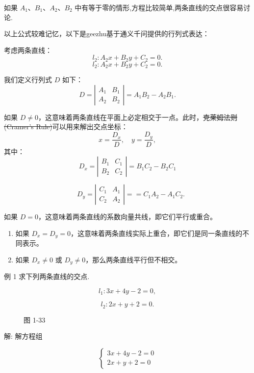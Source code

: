 \documentclass[lang=cn,newtx,12pt,scheme=chinese]{elegantbook}
\begin{document}
如果 \({A}_{1}\text{、}{B}_{1}\text{、}{A}_{2}\text{、}{B}_{2}\) 中有等于零的情形,方程比较简单,两条直线的交点很容易讨论.

以上公式较难记忆，以下是geezhu基于通义千问提供的行列式表达：

考虑两条直线：
\[
l_2: A_2x + B_2y + C_2 = 0.
\]
\[
l_2: A_2x + B_2y + C_2 = 0.
\]

我们定义行列式 \(D\) 如下：
\[
  D = \left| \begin{array}{cc}
               A_1 & B_1 \\
               A_2 & B_2
  \end{array} \right| = A_1B_2 - A_2B_1.
\]

如果 \(D \neq 0\)，这意味着两条直线在平面上必定相交于一点。此时，\sout{克莱姆法则(Cramer's Rule)}可以用来解出交点坐标：
\[
  x = \frac{D_x}{D}, \quad y = \frac{D_y}{D},
\]
其中：
\[
  D_x = \left| \begin{array}{cc}
                  B_1 & C_1 \\
                  B_2 & C_2
  \end{array} \right|=B_1C_2-B_2C_1\]

\[ \quad
D_y = \left| \begin{array}{cc}
               C_1 & A_1 \\
               C_2 & A_2
\end{array} \right| ==C_1A_2-A_1C_2.
\]

如果 \(D = 0\)，这意味着两条直线的系数向量共线，即它们平行或重合。

\begin{enumerate}
  \item 如果 \(D_x = D_y = 0\)，这意味着两条直线实际上重合，即它们是同一条直线的不同表示。
  \item 如果 \(D_x \neq 0\) 或 \(D_y \neq 0\)，那么两条直线平行但不相交。
\end{enumerate}

例 1 求下列两条直线的交点.

\[
    {l}_{1} : {3x} + {4y} - 2 = 0,
\]

\[
    {l}_{2} : {2x} + y + 2 = 0.
\]

\begin{figure}[h]
  \centering
  
  \caption{图 1-33}
\end{figure}

解: 解方程组

\[
  \left\{ \begin{array}{l} {3x} + {4y} - 2 = 0 \\ {2x} + y + 2 = 0 \end{array}\right.
\]
\end{document}
